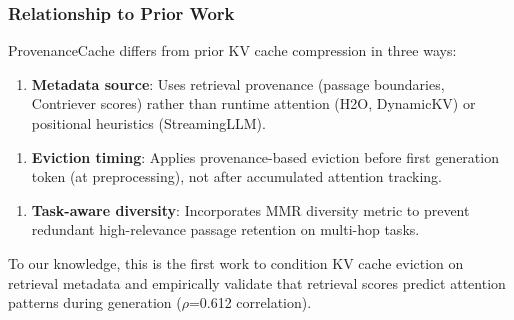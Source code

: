 \subsubsection{Relationship to Prior Work}

ProvenanceCache differs from prior KV cache compression in three ways:

\begin{enumerate}
\item \textbf{Metadata source}: Uses retrieval provenance (passage boundaries, Contriever scores) rather than runtime attention (H2O, DynamicKV) or positional heuristics (StreamingLLM).
\end{enumerate}

\begin{enumerate}
\item \textbf{Eviction timing}: Applies provenance-based eviction before first generation token (at preprocessing), not after accumulated attention tracking.
\end{enumerate}

\begin{enumerate}
\item \textbf{Task-aware diversity}: Incorporates MMR diversity metric to prevent redundant high-relevance passage retention on multi-hop tasks.
\end{enumerate}

To our knowledge, this is the first work to condition KV cache eviction on retrieval metadata and empirically validate that retrieval scores predict attention patterns during generation ($\rho$=0.612 correlation).
